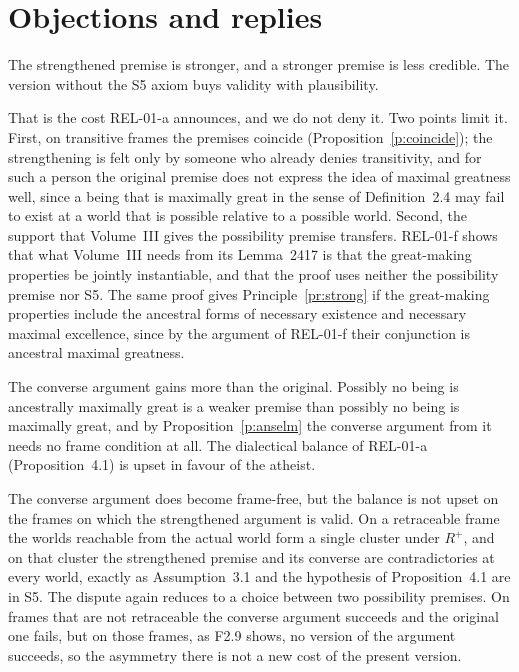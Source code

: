\documentclass{situationist-preprint}
\newcommand{\Rp}{R^{+}}
\begin{document}
\section{Objections and replies}\label{s:objections}

\begin{objection}
The strengthened premise is stronger, and a stronger premise is less credible. The version without the S5 axiom buys validity with plausibility.
\end{objection}

\begin{reply}
That is the cost REL-01-a announces, and we do not deny it. Two points limit it. First, on transitive frames the premises coincide (Proposition~\ref{p:coincide}); the strengthening is felt only by someone who already denies transitivity, and for such a person the original premise does not express the idea of maximal greatness well, since a being that is maximally great in the sense of Definition~2.4 may fail to exist at a world that is possible relative to a possible world. Second, the support that Volume~III gives the possibility premise transfers. REL-01-f shows that what Volume~III needs from its Lemma~2417 is that the great-making properties be jointly instantiable, and that the proof uses neither the possibility premise nor S5. The same proof gives Principle~\ref{pr:strong} if the great-making properties include the ancestral forms of necessary existence and necessary maximal excellence, since by the argument of REL-01-f their conjunction is ancestral maximal greatness.
\end{reply}

\begin{objection}
The converse argument gains more than the original. Possibly no being is ancestrally maximally great is a weaker premise than possibly no being is maximally great, and by Proposition~\ref{p:anselm} the converse argument from it needs no frame condition at all. The dialectical balance of REL-01-a (Proposition~4.1) is upset in favour of the atheist.
\end{objection}

\begin{reply}
The converse argument does become frame-free, but the balance is not upset on the frames on which the strengthened argument is valid. On a retraceable frame the worlds reachable from the actual world form a single cluster under $\Rp$, and on that cluster the strengthened premise and its converse are contradictories at every world, exactly as Assumption~3.1 and the hypothesis of Proposition~4.1 are in S5. The dispute again reduces to a choice between two possibility premises. On frames that are not retraceable the converse argument succeeds and the original one fails, but on those frames, as F2.9 shows, no version of the argument succeeds, so the asymmetry there is not a new cost of the present version.
\end{reply}
\end{document}
